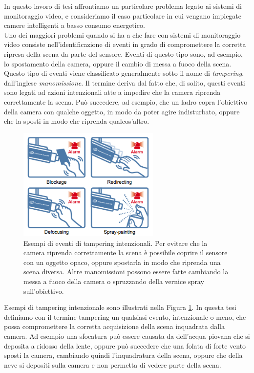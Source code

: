 In questo lavoro di tesi affrontiamo un particolare problema legato ai sistemi di monitoraggio video, e consideriamo il caso particolare in cui vengano impiegate camere intelligenti a basso consumo energetico.\\
Uno dei maggiori problemi quando si ha a che fare con sistemi di monitoraggio video consiste nell'identificazione di eventi in grado di compromettere la corretta ripresa della scena da parte del sensore.
Eventi di questo tipo sono, ad esempio, lo spostamento della camera, oppure il cambio di messa a fuoco della scena.\\
Questo tipo di eventi viene classificato generalmente sotto il nome di \textit{tampering}, dall'inglese \textit{manomissione}.
Il termine deriva dal fatto che, di solito, questi eventi sono legati ad azioni intenzionali atte a impedire che la camera riprenda correttamente la scena.
Pu\`o succedere, ad esempio, che un ladro copra l'obiettivo della camera con qualche oggetto, in modo da poter agire indisturbato, oppure che la sposti in modo che riprenda qualcos'altro.
\begin{figure}
	\centering
	\includegraphics[width=7cm]{pictures/tamperdetection}
	\caption[Esempi di eventi di tampering intenzionali]{Esempi di eventi di tampering intenzionali. Per evitare che la camera riprenda correttamente la scena \`e possibile coprire il sensore con un oggetto opaco, oppure spostarla in modo che riprenda una scena diversa. Altre manomissioni possono essere fatte cambiando la messa a fuoco della camera o spruzzando della vernice spray sull'obiettivo.}
	\label{fig:tamperdetection}
\end{figure}
Esempi di tampering intenzionale sono illustrati nella Figura \ref{fig:tamperdetection}.
In questa tesi definiamo con il termine tampering un qualsiasi evento, intenzionale o meno, che possa compromettere la corretta acquisizione della scena inquadrata dalla camera.
Ad esempio una sfocatura pu\`o essere causata da dell'acqua piovana che si deposita a ridosso della lente, oppure pu\`o succedere che una folata di forte vento sposti la camera, cambiando quindi l'inquadratura della scena, oppure che della neve si depositi sulla camera e non permetta di vedere parte della scena.
